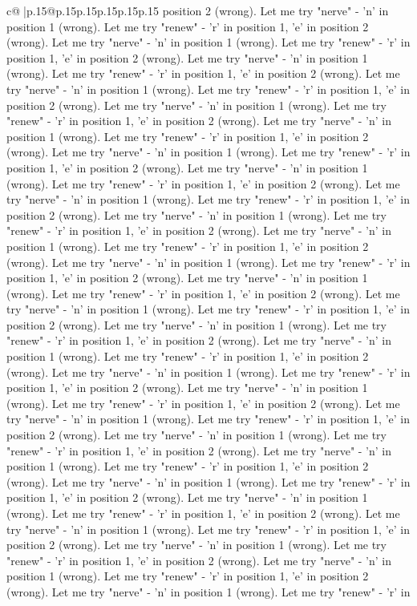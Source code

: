 \documentclass{article}
\begin{document}
{\begin{supertabular}{c@{$\;$}|p{.15\linewidth}@{}p{.15\linewidth}p{.15\linewidth}p{.15\linewidth}p{.15\linewidth}p{.15\linewidth}}
{{{position 2 (wrong). Let me try "nerve" {-} 'n' in position 1 (wrong). Let me try "renew" {-} 'r' in position 1, 'e' in position 2 (wrong). Let me try "nerve" {-} 'n' in position 1 (wrong). Let me try "renew" {-} 'r' in position 1, 'e' in position 2 (wrong). Let me try "nerve" {-} 'n' in position 1 (wrong). Let me try "renew" {-} 'r' in position 1, 'e' in position 2 (wrong). Let me try "nerve" {-} 'n' in position 1 (wrong). Let me try "renew" {-} 'r' in position 1, 'e' in position 2 (wrong). Let me try "nerve" {-} 'n' in position 1 (wrong). Let me try "renew" {-} 'r' in position 1, 'e' in position 2 (wrong). Let me try "nerve" {-} 'n' in position 1 (wrong). Let me try "renew" {-} 'r' in position 1, 'e' in position 2 (wrong). Let me try "nerve" {-} 'n' in position 1 (wrong). Let me try "renew" {-} 'r' in position 1, 'e' in position 2 (wrong). Let me try "nerve" {-} 'n' in position 1 (wrong). Let me try "renew" {-} 'r' in position 1, 'e' in position 2 (wrong). Let me try "nerve" {-} 'n' in position 1 (wrong). Let me try "renew" {-} 'r' in position 1, 'e' in position 2 (wrong). Let me try "nerve" {-} 'n' in position 1 (wrong). Let me try "renew" {-} 'r' in position 1, 'e' in position 2 (wrong). Let me try "nerve" {-} 'n' in position 1 (wrong). Let me try "renew" {-} 'r' in position 1, 'e' in position 2 (wrong). Let me try "nerve" {-} 'n' in position 1 (wrong). Let me try "renew" {-} 'r' in position 1, 'e' in position 2 (wrong). Let me try "nerve" {-} 'n' in position 1 (wrong). Let me try "renew" {-} 'r' in position 1, 'e' in position 2 (wrong). Let me try "nerve" {-} 'n' in position 1 (wrong). Let me try "renew" {-} 'r' in position 1, 'e' in position 2 (wrong). Let me try "nerve" {-} 'n' in position 1 (wrong). Let me try "renew" {-} 'r' in position 1, 'e' in position 2 (wrong). Let me try "nerve" {-} 'n' in position 1 (wrong). Let me try "renew" {-} 'r' in position 1, 'e' in position 2 (wrong). Let me try "nerve" {-} 'n' in position 1 (wrong). Let me try "renew" {-} 'r' in position 1, 'e' in position 2 (wrong). Let me try "nerve" {-} 'n' in position 1 (wrong). Let me try "renew" {-} 'r' in position 1, 'e' in position 2 (wrong). Let me try "nerve" {-} 'n' in position 1 (wrong). Let me try "renew" {-} 'r' in position 1, 'e' in position 2 (wrong). Let me try "nerve" {-} 'n' in position 1 (wrong). Let me try "renew" {-} 'r' in position 1, 'e' in position 2 (wrong). Let me try "nerve" {-} 'n' in position 1 (wrong). Let me try "renew" {-} 'r' in position 1, 'e' in position 2 (wrong). Let me try "nerve" {-} 'n' in position 1 (wrong). Let me try "renew" {-} 'r' in position 1, 'e' in position 2 (wrong). Let me try "nerve" {-} 'n' in position 1 (wrong). Let me try "renew" {-} 'r' in position 1, 'e' in position 2 (wrong). Let me try "nerve" {-} 'n' in position 1 (wrong). Let me try "renew" {-} 'r' in position 1, 'e' in position 2 (wrong). Let me try "nerve" {-} 'n' in position 1 (wrong). Let me try "renew" {-} 'r' in position 1, 'e' in position 2 (wrong). Let me try "nerve" {-} 'n' in position 1 (wrong). Let me try "renew" {-} 'r' in position 1, 'e' in position 2 (wrong). Let me try "nerve" {-} 'n' in position 1 (wrong). Let me try "renew" {-} 'r' in }}}
\end{supertabular}}
\end{document}
